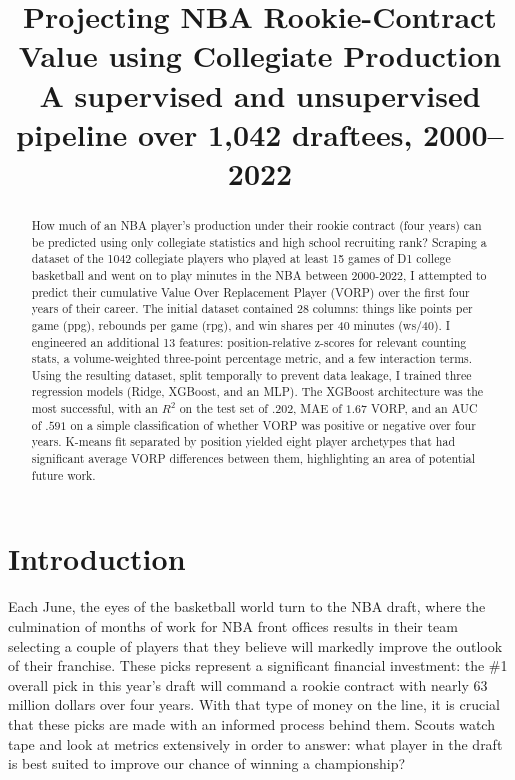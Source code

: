 \documentclass[conference]{IEEEtran}
\begin{document}
\title{Projecting NBA Rookie-Contract Value using Collegiate Production\\
\large A supervised and unsupervised pipeline over 1,042 draftees, 2000--2022}

\author{
}

\maketitle

\begin{abstract}
How much of an NBA player's production under their rookie contract (four years) can be predicted using only collegiate statistics and high school recruiting rank? Scraping a dataset of the 1042 collegiate players who played at least 15 games of D1 college basketball and went on to play minutes in the NBA between 2000-2022, I attempted to predict their cumulative Value Over Replacement Player (VORP) over the first four years of their career. The initial dataset contained 28 columns: things like points per game (ppg), rebounds per game (rpg), and win shares per 40 minutes (ws/40). I engineered an additional 13 features: position-relative z-scores for relevant counting stats, a volume-weighted three-point percentage metric, and a few interaction terms. Using the resulting dataset, split temporally to prevent data leakage, I trained three regression models (Ridge, XGBoost, and an MLP). The XGBoost architecture was the most successful, with an $R^2$ on the test set of $.202$, MAE of $1.67$ VORP, and an AUC of $.591$ on a simple classification of whether VORP was positive or negative over four years. K-means fit separated by position yielded eight player archetypes that had significant average VORP differences between them, highlighting an area of potential future work.
\end{abstract}
\section{Introduction}

Each June, the eyes of the basketball world turn to the NBA draft, where the culmination of months of work for NBA front offices results in their team selecting a couple of players that they believe will markedly improve the outlook of their franchise. These picks represent a significant financial investment: the \#1 overall pick in this year's draft will command a rookie contract with nearly 63 million dollars over four years. With that type of money on the line, it is crucial that these picks are made with an informed process behind them. Scouts watch tape and look at metrics extensively in order to answer: what player in the draft is best suited to improve our chance of winning a championship?
\end{document}
